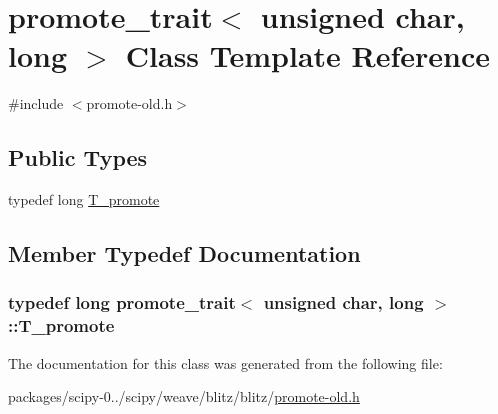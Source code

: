 \hypertarget{classpromote__trait_3_01unsigned_01char_00_01long_01_4}{}\section{promote\+\_\+trait$<$ unsigned char, long $>$ Class Template Reference}
\label{classpromote__trait_3_01unsigned_01char_00_01long_01_4}


{\ttfamily \#include $<$promote-\/old.\+h$>$}

\subsection*{Public Types}
\begin{DoxyCompactItemize}
\item 
typedef long \hyperlink{classpromote__trait_3_01unsigned_01char_00_01long_01_4_a48ba4efa121b2328f03125d84cdbf988}{T\+\_\+promote}
\end{DoxyCompactItemize}


\subsection{Member Typedef Documentation}
\hypertarget{classpromote__trait_3_01unsigned_01char_00_01long_01_4_a48ba4efa121b2328f03125d84cdbf988}{}
\subsubsection[{T\+\_\+promote}]{\setlength{\rightskip}{0pt plus 5cm}typedef long {\bf promote\+\_\+trait}$<$ unsigned char, long $>$\+::{\bf T\+\_\+promote}}\label{classpromote__trait_3_01unsigned_01char_00_01long_01_4_a48ba4efa121b2328f03125d84cdbf988}


The documentation for this class was generated from the following file\+:\begin{DoxyCompactItemize}
\item 
packages/scipy-\/0../scipy/weave/blitz/blitz/\hyperlink{promote-old_8h}{promote-\/old.\+h}\end{DoxyCompactItemize}
